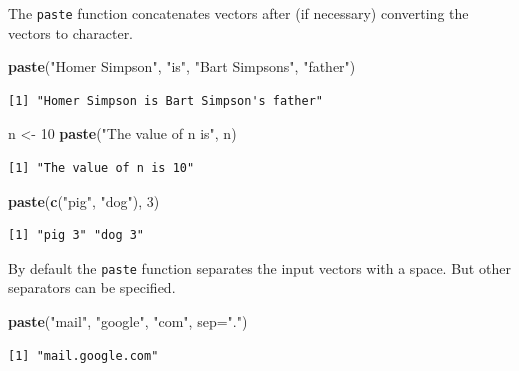 \documentclass[
]{krantz}
\makeatletter
\newenvironment{Shaded}{\begin{snugshade}}{\end{snugshade}}
\newcommand{\DataTypeTok}[1]{\textcolor[rgb]{0.27,0.27,0.27}{#1}}
\newcommand{\DecValTok}[1]{\textcolor[rgb]{0.06,0.06,0.06}{#1}}
\newcommand{\KeywordTok}[1]{\textcolor[rgb]{0.27,0.27,0.27}{\textbf{#1}}}
\newcommand{\NormalTok}[1]{#1}
\newcommand{\StringTok}[1]{\textcolor[rgb]{0.5,0.5,0.5}{#1}}
\newenvironment{kframe}{%
\medskip{}
\setlength{\fboxsep}{.8em}
 \def\at@end@of@kframe{}%
 \ifinner\ifhmode%
  \def\at@end@of@kframe{\end{minipage}}%
  \begin{minipage}{\columnwidth}%
 \fi\fi%
 \def\FrameCommand##1{\hskip\@totalleftmargin \hskip-\fboxsep
 \colorbox{shadecolor}{##1}\hskip-\fboxsep
     \hskip-\linewidth \hskip-\@totalleftmargin \hskip\columnwidth}%
 \MakeFramed {\advance\hsize-\width
   \@totalleftmargin\z@ \linewidth\hsize
   \@setminipage}}%
 {\par\unskip\endMakeFramed%
 \at@end@of@kframe}
\renewenvironment{Shaded}{\begin{kframe}}{\end{kframe}}
\makeatother
\begin{document}
The \texttt{paste} function concatenates vectors after (if necessary) converting the vectors to character.

\begin{Shaded}
\begin{Highlighting}[]
\KeywordTok{paste}\NormalTok{(}\StringTok{"Homer Simpson"}\NormalTok{, }\StringTok{"is"}\NormalTok{, }\StringTok{"Bart Simpson\textquotesingle{}s"}\NormalTok{, }\StringTok{"father"}\NormalTok{)}
\end{Highlighting}
\end{Shaded}

\begin{verbatim}
[1] "Homer Simpson is Bart Simpson's father"
\end{verbatim}

\begin{Shaded}
\begin{Highlighting}[]
\NormalTok{n \textless{}{-}}\StringTok{ }\DecValTok{10}
\KeywordTok{paste}\NormalTok{(}\StringTok{"The value of n is"}\NormalTok{, n)}
\end{Highlighting}
\end{Shaded}

\begin{verbatim}
[1] "The value of n is 10"
\end{verbatim}

\begin{Shaded}
\begin{Highlighting}[]
\KeywordTok{paste}\NormalTok{(}\KeywordTok{c}\NormalTok{(}\StringTok{"pig"}\NormalTok{, }\StringTok{"dog"}\NormalTok{), }\DecValTok{3}\NormalTok{)}
\end{Highlighting}
\end{Shaded}

\begin{verbatim}
[1] "pig 3" "dog 3"
\end{verbatim}

By default the \texttt{paste} function separates the input vectors with a space. But other separators can be specified.

\begin{Shaded}
\begin{Highlighting}[]
\KeywordTok{paste}\NormalTok{(}\StringTok{"mail"}\NormalTok{, }\StringTok{"google"}\NormalTok{, }\StringTok{"com"}\NormalTok{, }\DataTypeTok{sep=}\StringTok{"."}\NormalTok{)}
\end{Highlighting}
\end{Shaded}

\begin{verbatim}
[1] "mail.google.com"
\end{verbatim}
\end{document}
